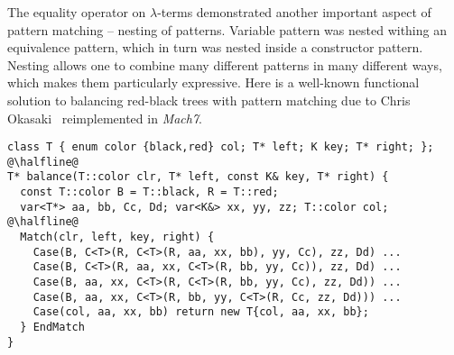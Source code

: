 %
%

The equality operator on $\lambda$-terms demonstrated another important aspect 
of pattern matching -- nesting of patterns. Variable pattern was nested withing 
an equivalence pattern, which in turn was nested inside a constructor pattern. 
Nesting allows one to combine many different patterns in many different ways, 
which makes them particularly expressive. Here is a well-known functional 
solution to balancing red-black trees with pattern matching due to Chris 
Okasaki~\cite[]{okasaki1999purely} reimplemented in \emph{Mach7}.

\begin{lstlisting}
class T { enum color {black,red} col; T* left; K key; T* right; };
@\halfline@
T* balance(T::color clr, T* left, const K& key, T* right) {
  const T::color B = T::black, R = T::red;
  var<T*> aa, bb, Cc, Dd; var<K&> xx, yy, zz; T::color col;
@\halfline@
  Match(clr, left, key, right) {
    Case(B, C<T>(R, C<T>(R, aa, xx, bb), yy, Cc), zz, Dd) ...
    Case(B, C<T>(R, aa, xx, C<T>(R, bb, yy, Cc)), zz, Dd) ...
    Case(B, aa, xx, C<T>(R, C<T>(R, bb, yy, Cc), zz, Dd)) ...
    Case(B, aa, xx, C<T>(R, bb, yy, C<T>(R, Cc, zz, Dd))) ...
    Case(col, aa, xx, bb) return new T{col, aa, xx, bb};
  } EndMatch
}
\end{lstlisting}

